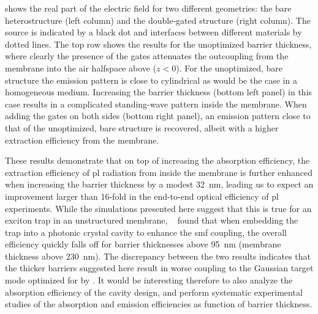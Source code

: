  shows the real part of the electric field for two different geometries: the bare heterostructure (left column) and the double-gated structure (right column).
The source is indicated by a black dot and interfaces between different materials by dotted lines.
The top row shows the results for the unoptimized barrier thickness, where clearly the presence of the gates attenuates the outcoupling from the membrane into the air halfspace above ($z < 0$).
For the unoptimized, bare structure the emission pattern is close to cylindrical as would be the case in a homogeneous medium.
Increasing the barrier thickness (bottom left panel) in this case results in a complicated standing-wave pattern inside the membrane.
When adding the gates on both sides (bottom right panel), an emission pattern close to that of the unoptimized, bare structure is recovered, albeit with a higher extraction efficiency from the membrane.

These results demonstrate that on top of increasing the absorption efficiency, the extraction efficiency of \gls{pl} radiation from inside the membrane is further enhanced when increasing the  barrier thickness by a modest \qty{32}{\nano\meter}, leading us to expect an improvement larger than 16-fold in the end-to-end optical efficiency of \gls{pl} experiments.
While the simulations presented here suggest that this is true for an exciton trap in an unstructured membrane, \citeauthor{Wu2020}~\cite{Wu2020,Wu2024} found that when embedding the trap into a photonic crystal cavity to enhance the \acrlong{smf} coupling, the overall efficiency quickly falls off for barrier thicknesses above \qty{95}{\nano\meter} (membrane thickness above \qty{230}{\nano\meter}).
The discrepancy between the two results indicates that the thicker barriers suggested here result in worse coupling to the Gaussian target mode optimized for by \citet{Wu2020}.
It would be interesting therefore to also analyze the absorption efficiency of the cavity design, and perform systematic experimental studies of the absorption and emission efficiencies as function of barrier thickness.
